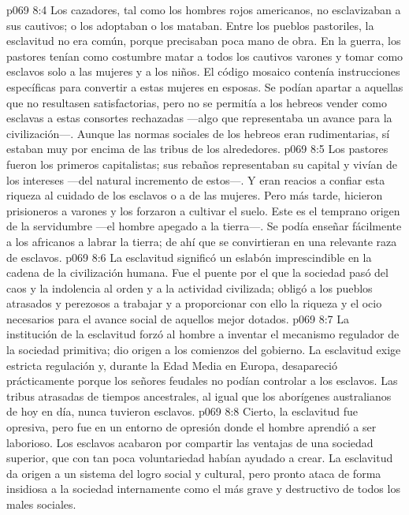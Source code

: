 \vs p069 8:4 Los cazadores, tal como los hombres rojos americanos, no esclavizaban a sus cautivos; o los adoptaban o los mataban. Entre los pueblos pastoriles, la esclavitud no era común, porque precisaban poca mano de obra. En la guerra, los pastores tenían como costumbre matar a todos los cautivos varones y tomar como esclavos solo a las mujeres y a los niños. El código mosaico contenía instrucciones específicas para convertir a estas mujeres en esposas. Se podían apartar a aquellas que no resultasen satisfactorias, pero no se permitía a los hebreos vender como esclavas a estas consortes rechazadas ---algo que representaba un avance para la civilización---. Aunque las normas sociales de los hebreos eran rudimentarias, sí estaban muy por encima de las tribus de los alrededores.
\vs p069 8:5 Los pastores fueron los primeros capitalistas; sus rebaños representaban su capital y vivían de los intereses ---del natural incremento de estos---. Y eran reacios a confiar esta riqueza al cuidado de los esclavos o a de las mujeres. Pero más tarde, hicieron prisioneros a varones y los forzaron a cultivar el suelo. Este es el temprano origen de la servidumbre ---el hombre apegado a la tierra---. Se podía enseñar fácilmente a los africanos a labrar la tierra; de ahí que se convirtieran en una relevante raza de esclavos.
\vs p069 8:6 \pc La esclavitud significó un eslabón imprescindible en la cadena de la civilización humana. Fue el puente por el que la sociedad pasó del caos y la indolencia al orden y a la actividad civilizada; obligó a los pueblos atrasados y perezosos a trabajar y a proporcionar con ello la riqueza y el ocio necesarios para el avance social de aquellos mejor dotados.
\vs p069 8:7 La institución de la esclavitud forzó al hombre a inventar el mecanismo regulador de la sociedad primitiva; dio origen a los comienzos del gobierno. La esclavitud exige estricta regulación y, durante la Edad Media en Europa, desapareció prácticamente porque los señores feudales no podían controlar a los esclavos. Las tribus atrasadas de tiempos ancestrales, al igual que los aborígenes australianos de hoy en día, nunca tuvieron esclavos.
\vs p069 8:8 Cierto, la esclavitud fue opresiva, pero fue en un entorno de opresión donde el hombre aprendió a ser laborioso. Los esclavos acabaron por compartir las ventajas de una sociedad superior, que con tan poca voluntariedad habían ayudado a crear. La esclavitud da origen a un sistema del logro social y cultural, pero pronto ataca de forma insidiosa a la sociedad internamente como el más grave y destructivo de todos los males sociales.
